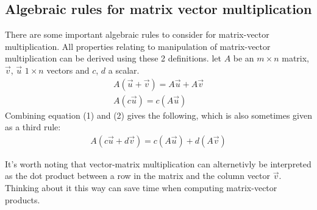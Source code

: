 \documentclass[11pt, a4paper]{article}
\begin{document}
\subsection{Algebraic rules for matrix vector multiplication}
There are some important algebraic rules to consider for matrix-vector multiplication. All properties
relating to manipulation of matrix-vector multiplication can be derived using these 2 definitions.
let $A$ be an $m \times n$ matrix, $\vec{v}$, $\vec{u}$ $1 \times n$ vectors and $c$, $d$ a scalar.
\begin{gather}
  A(\vec{u} + \vec{v}) = A\vec{u} + A\vec{v}\\
  A(c\vec{u}) = c(A\vec{u})
\end{gather}
Combining equation (1) and (2) gives the following, which is also sometimes given as a third rule:
\begin{gather}
  A(c\vec{u} + d\vec{v}) = c(A\vec{u}) + d(A\vec{v})
\end{gather}

It's worth noting that vector-matrix multiplication can alternetivly be interpreted as the dot product
between a row in the matrix and the column vector $\vec{v}$. Thinking about it this way can save time
when computing matrix-vector products.
\end{document}
